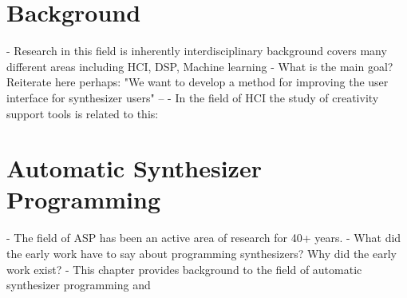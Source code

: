 \chapter{Background}
\label{chapter:background}
- Research in this field is inherently interdisciplinary background covers many different areas including HCI, DSP, Machine learning
- What is the main goal? Reiterate here perhaps: "We want to develop a method for improving the user interface for synthesizer users" -- 
- In the field of HCI the study of creativity support tools is related to this:






\chapter{Automatic Synthesizer Programming}
\label{chapter:asp-background}
- The field of ASP has been an active area of research for 40+ years.
- What did the early work have to say about programming synthesizers? Why did the early work exist?
- This chapter provides background to the field of automatic synthesizer programming and 





%